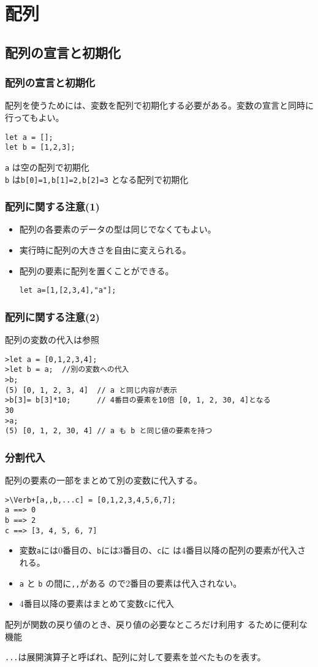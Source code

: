 \section{配列}
\subsection{配列の宣言と初期化}
\begin{frame}[containsverbatim]
 \frametitle{配列の宣言と初期化}
配列を使うためには、変数を配列で初期化する必要がある。変数の宣言と同時に
行ってもよい。
\begin{Verbatim}
let a = [];
let b = [1,2,3];
\end{Verbatim}
 \Verb+a+ は空の配列で初期化\\
 \Verb+b+ は\Verb+b[0]=1,b[1]=2,b[2]=3+ となる配列で初期化
\end{frame}
\begin{frame}[containsverbatim]
 \frametitle{配列に関する注意(1)}
\begin{itemize}
 \item 配列の各要素のデータの型は同じでなくてもよい。
 \item 実行時に配列の大きさを自由に変えられる。
 \item 配列の要素に配列を置くことができる。
\begin{Verbatim}
let a=[1,[2,3,4],"a"];
\end{Verbatim}
\end{itemize}
\end{frame}
\begin{frame}[containsverbatim]
 \frametitle{配列に関する注意(2)}
配列の変数の代入は参照
\begin{Verbatim}
>let a = [0,1,2,3,4];
>let b = a;  //別の変数への代入
>b;
(5) [0, 1, 2, 3, 4]  // a と同じ内容が表示
>b[3]= b[3]*10;      // 4番目の要素を10倍 [0, 1, 2, 30, 4]となる
30
>a;
(5) [0, 1, 2, 30, 4] // a も b と同じ値の要素を持つ
\end{Verbatim}
\end{frame}
\begin{frame}[containsverbatim]
 \frametitle{分割代入}
 配列の要素の一部をまとめて別の変数に代入する。
\begin{Verbatim}
>\Verb+[a,,b,...c] = [0,1,2,3,4,5,6,7];
a ==> 0
b ==> 2
c ==> [3, 4, 5, 6, 7]
\end{Verbatim}
       \begin{itemize}
        \item  変数\Verb+a+には0番目の、\Verb+b+には3番目の、\Verb+c+に
               は4番目以降の配列の要素が代入される。
        \item \Verb+a+ と \Verb+b+ の間に\Verb+,,+がある
       ので2番目の要素は代入されない。
        \item 4番目以降の要素はまとめて変数\Verb+c+に代入
       \end{itemize}
 配列が関数の戻り値のとき、戻り値の必要なところだけ利用す
       るために便利な機能

 \Verb+...+は展開演算子と呼ばれ、配列に対して要素を並べたものを表す。
\end{frame}
